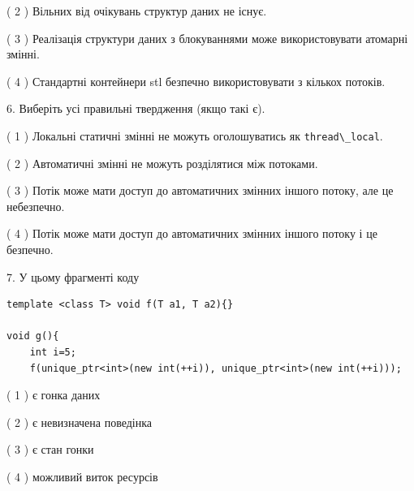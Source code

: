 \documentclass[12pt, ukrainian]{article}
\def\code#1{\Verb!#1!}
\begin{document}
\begin {large}
{( 2 ) Вільних від очікувань структур даних не існує.%

( 3 ) Реалізація структури даних з блокуваннями може використовувати атомарні змінні.%

( 4 ) Стандартні контейнери stl безпечно використовувати з кількох потоків.%
\newpage



\vspace{5mm}
6. Виберіть усі правильні твердження (якщо такі є).\par
\vspace{2mm}

( 1 ) Локальні статичні змінні не можуть оголошуватись як \code{thread\_local}.%

( 2 ) Автоматичні змінні не можуть розділятися між потоками.%

( 3 ) Потік може мати доступ до автоматичних змінних іншого потоку, але це небезпечно.%

( 4 ) Потік може мати доступ до автоматичних змінних іншого потоку і це безпечно.%


\vspace{5mm}
7. У цьому фрагменті коду
\begin{verbatim}
template <class T> void f(T a1, T a2){}

void g(){
    int i=5;
    f(unique_ptr<int>(new int(++i)), unique_ptr<int>(new int(++i)));
\end{verbatim}

( 1 ) є гонка даних%

( 2 ) є невизначена поведінка%

( 3 ) є стан гонки%

( 4 ) можливий виток ресурсів%
}
\end {large}
\end{document}
